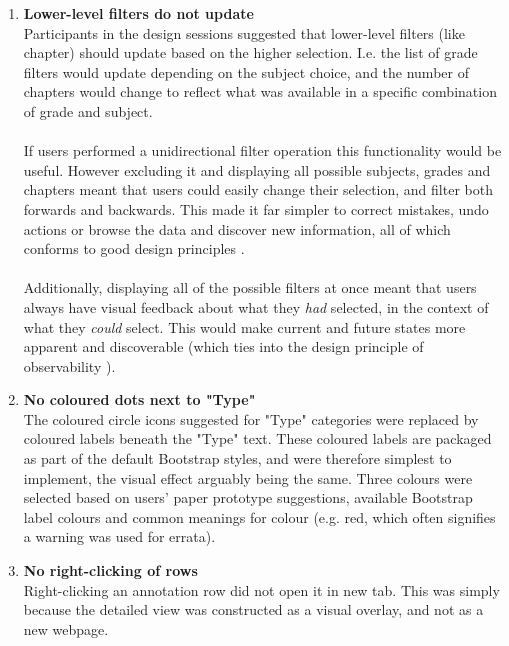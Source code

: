 \begin{enumerate}
\item \textbf{Lower-level filters do not update}\\
Participants in the design sessions suggested that lower-level filters (like chapter) should update based on the higher selection. I.e. the list of grade filters would update depending on the subject choice, and the number of chapters would change to reflect what was available in a specific combination of grade and subject. \\
\\
If users performed a unidirectional filter operation this functionality would be useful. However excluding it and displaying all possible subjects, grades and chapters meant that users could easily change their selection, and filter both forwards and backwards. This made it far simpler to correct mistakes, undo actions or browse the data and discover new information, all of which conforms to good design principles \citep[p. 272]{DixFinlay}. \\
\\
Additionally, displaying all of the possible filters at once meant that users always have visual feedback about what they \textit{had} selected, in the context of what they \textit{could} select. This would make current and future states more apparent and discoverable (which ties into the design principle of observability \citep[p. 270]{DixFinlay}).  

\item \textbf{No coloured dots next to "Type"}\\
The coloured circle icons suggested for "Type" categories were replaced by coloured labels beneath the "Type" text.  These coloured labels are packaged as part of the default Bootstrap styles, and were therefore simplest to implement, the visual  effect arguably being the same. Three colours were selected based on users' paper prototype suggestions, available Bootstrap label colours and common meanings for colour \citep[p. 635]{Galitz} (e.g. red, which often signifies a warning was used for errata).

\item \textbf{No right-clicking of rows}\\
Right-clicking an annotation row did not open it in new tab. This was simply because the detailed view was constructed as a visual overlay, and not as a new webpage. 


\end{enumerate}
